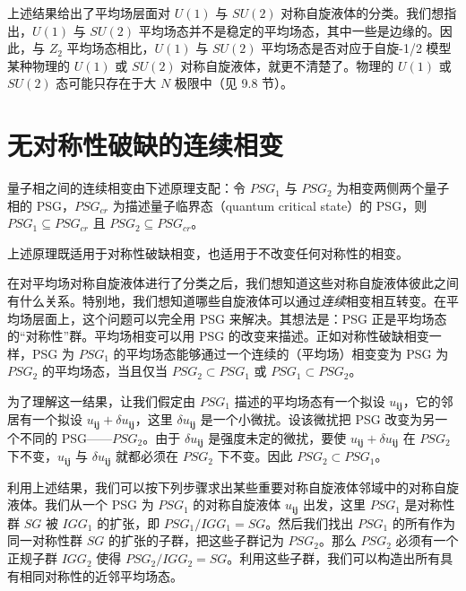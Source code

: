 上述结果给出了平均场层面对 $U(1)$ 与 $SU(2)$ 对称自旋液体的分类。我们想指出，$U(1)$ 与 $SU(2)$ 平均场态并不是稳定的平均场态，其中一些是边缘的。因此，与 $Z_{2}$ 平均场态相比，$U(1)$ 与 $SU(2)$ 平均场态是否对应于自旋-1/2 模型某种物理的 $U(1)$ 或 $SU(2)$ 对称自旋液体，就更不清楚了。物理的 $U(1)$ 或 $SU(2)$ 态可能只存在于大 $N$ 极限中（见 9.8 节）。

\section{无对称性破缺的连续相变}

\begin{keypoints}
\item 量子相之间的连续相变由下述原理支配：令 $PSG_{1}$ 与 $PSG_{2}$ 为相变两侧两个量子相的 PSG，$PSG_{cr}$ 为描述量子临界态（quantum critical state）的 PSG，则 $PSG_{1}\subseteq PSG_{cr}$ 且 $PSG_{2}\subseteq PSG_{cr}$。
\item 上述原理既适用于对称性破缺相变，也适用于不改变任何对称性的相变。
\end{keypoints}

在对平均场对称自旋液体进行了分类之后，我们想知道这些对称自旋液体彼此之间有什么关系。特别地，我们想知道哪些自旋液体可以通过\emph{连续}相变相互转变。在平均场层面上，这个问题可以完全用 PSG 来解决。其想法是：PSG 正是平均场态的“对称性”群。平均场相变可以用 PSG 的改变来描述。正如对称性破缺相变一样，PSG 为 $PSG_{1}$ 的平均场态能够通过一个连续的（平均场）相变变为 PSG 为 $PSG_{2}$ 的平均场态，当且仅当 $PSG_{2}\subset PSG_{1}$ 或 $PSG_{1}\subset PSG_{2}$。

为了理解这一结果，让我们假定由 $PSG_{1}$ 描述的平均场态有一个拟设 $u_{\pmb{ij}}$，它的邻居有一个拟设 $u_{\pmb{ij}}+\delta u_{\pmb{ij}}$，这里 $\delta u_{\pmb{ij}}$ 是一个小微扰。设该微扰把 PSG 改变为另一个不同的 PSG——$PSG_{2}$。由于 $\delta u_{\pmb{ij}}$ 是强度未定的微扰，要使 $u_{\pmb{ij}}+\delta u_{\pmb{ij}}$ 在 $PSG_{2}$ 下不变，$u_{\pmb{ij}}$ 与 $\delta u_{\pmb{ij}}$ 就都必须在 $PSG_{2}$ 下不变。因此 $PSG_{2}\subset PSG_{1}$。

利用上述结果，我们可以按下列步骤求出某些重要对称自旋液体邻域中的对称自旋液体。我们从一个 PSG 为 $PSG_{1}$ 的对称自旋液体 $u_{\pmb{ij}}$ 出发，这里 $PSG_{1}$ 是对称性群 $SG$ 被 $IGG_{1}$ 的扩张，即 $PSG_{1}/IGG_{1}=SG$。然后我们找出 $PSG_{1}$ 的所有作为同一对称性群 $SG$ 的扩张的子群，把这些子群记为 $PSG_{2}$。那么 $PSG_{2}$ 必须有一个正规子群 $IGG_{2}$ 使得 $PSG_{2}/IGG_{2}=SG$。利用这些子群，我们可以构造出所有具有相同对称性的近邻平均场态。

